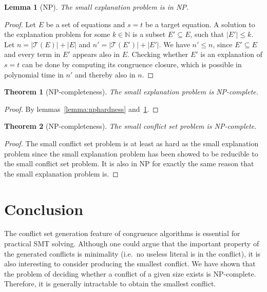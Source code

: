 \documentclass{easychair}
\newtheorem{theorem}{Theorem}
\newtheorem{lemma}{Lemma}
\begin{document}
\begin{lemma}[NP]
\label{lemma:innp}
The small explanation problem is in NP.
\end{lemma}
\begin{proof}
Let $E$ be a set of equations and $s=t$ be a target equation.
A solution to the explanation problem for some $k \in \mathbb{N}$ is a subset $E' \subseteq E$, such that $|E'| \leq k$.
Let $n = |\mathcal{T}(E)| + |E|$ and $n' = |\mathcal{T}(E')| + |E'|$.
We have $n' \leq n$, since $E' \subseteq E$ and every term in $E'$ appears also in $E$.
Checking whether $E'$ is an explanation of $s=t$ can be done by computing its congruence closure, which is possible in polynomial time in $n'$ \cite{Nelson2} and thereby also in $n$.

\end{proof}


\begin{theorem}[NP-completeness]
The small explanation problem is NP-complete.
\end{theorem}
\begin{proof}
By lemmas~\ref{lemma:nphardness} and~\ref{lemma:innp}.
\end{proof}

\begin{theorem}[NP-completeness]
The small conflict set problem is NP-complete.
\end{theorem}
\begin{proof}
The small conflict set problem is at least as hard as the small explanation problem since the small explanation problem has been showed to be reducible to the small conflict set problem.  It is also in NP for exactly the same reason that the small explanation problem is.
\end{proof}


\section*{Conclusion}

The conflict set generation feature of congruence algorithms is essential for
practical SMT solving.  Although one could argue that the important property of the generated conflicts is minimality (i.e.\ no useless literal is in the conflict), it is also interesting to consider producing the smallest conflict.  We have shown that the problem of deciding whether a conflict of a given size exists is NP-complete. Therefore, it is generally intractable to obtain the smallest conflict. 
\end{document}
